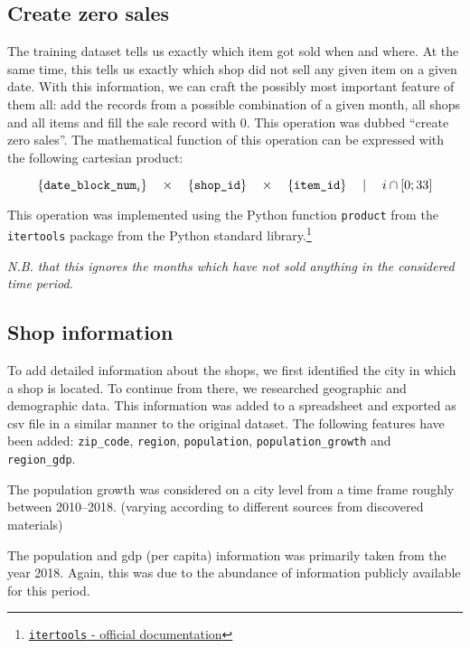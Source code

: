 \subsection{Create zero sales}\label{zerosales}

The training dataset tells us exactly which item got sold when and where. At the same time, this tells us exactly which shop did not sell any given item on a given date.
With this information, we can craft the possibly most important feature of them all: add the records from a possible combination of a given month, all shops and all items and fill the sale record with 0. This operation was dubbed \enquote{create zero sales}.
The mathematical function of this operation can be expressed with the following cartesian product:

\vspace*{-4mm}
$$
\{\text{\texttt{date\_block\_num}}_i\}
\quad \times \quad
\{{\text{\texttt{shop\_id}}}\}
\quad  \times \quad 
\{{\text{\texttt{item\_id}}}\}
\quad \mid \quad
i \cap [0; 33]
$$

This operation was implemented using the Python function \texttt{product} from the \texttt{itertools} package from the Python standard library.\footnote{\href{https://docs.python.org/3/library/itertools.html\#itertools.product}{\texttt{itertools} - official documentation}}

\noindent \textit{N.B. that this ignores the months which have not sold anything in the considered time period.}

\subsection{Shop information}

To add detailed information about the shops, we first identified the city in which a shop is located. To continue from there, we researched geographic and demographic data. This information was added to a spreadsheet and exported as \acrfull{csv} file in a similar manner to the original dataset. The following features have been added: \texttt{zip\_code}, \texttt{region}, \texttt{population}, \texttt{population\_growth} and \texttt{region\_gdp}.

The population growth was considered on a city level from a time frame roughly between 2010--2018. (varying according to different sources from discovered materials)

The population and gdp (per capita) information was primarily taken from the year 2018. Again, this was due to the abundance of information publicly available for this period.

